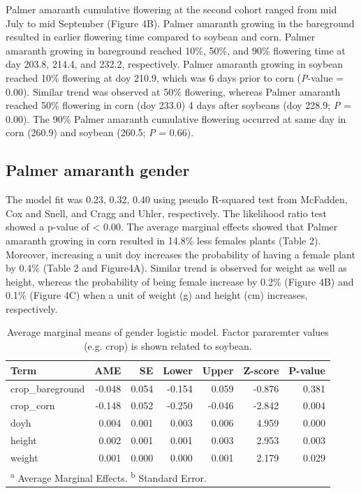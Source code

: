 \documentclass[utf8]{frontiersSCNS}
\begin{document}
Palmer amaranth cumulative flowering at the second cohort ranged from
mid July to mid September (Figure 4B). Palmer amaranth growing in the
bareground resulted in earlier flowering time compared to soybean and
corn. Palmer amaranth growing in bareground reached 10\%, 50\%, and 90\%
flowering time at day 203.8, 214.4, and 232.2, respectively. Palmer
amaranth growing in soybean reached 10\% flowering at doy 210.9, which
was 6 days prior to corn (\emph{P}-value = 0.00). Similar trend was
observed at 50\% flowering, whereas Palmer amaranth reached 50\%
flowering in corn (doy 233.0) 4 days after soybeans (doy 228.9; \emph{P}
= 0.00). The 90\% Palmer amaranth cumulative flowering occurred at same
day in corn (260.9) and soybean (260.5; \emph{P} = 0.66).

\hypertarget{palmer-amaranth-gender}{%
\subsection*{Palmer amaranth gender}\label{palmer-amaranth-gender}}

The model fit was 0.23, 0.32, 0.40 using pseudo R-squared test from
McFadden, Cox and Snell, and Cragg and Uhler, respectively. The
likelihood ratio test showed a p-value of \textless{} 0.00. The average
marginal effects showed that Palmer amaranth growing in corn resulted in
14.8\% less females plants (Table 2). Moreover, increasing a unit doy
increases the probability of having a female plant by 0.4\% (Table 2 and
Figure4A). Similar trend is observed for weight as well as height,
whereas the probability of being female increase by 0.2\% (Figure 4B)
and 0.1\% (Figure 4C) when a unit of weight (g) and height (cm)
increases, respectively.

\begin{table}[!h]

\caption{\label{tab:unnamed-chunk-3}Average marginal means of gender logistic model. Factor pararemter values (e.g. crop) is shown related to soybean.}
\centering
\fontsize{10}{12}\selectfont
\begin{tabular}[t]{lrrrrrr}
\toprule
Term & AME & SE & Lower & Upper & Z-score & P-value\\
\midrule
crop\_bareground & -0.048 & 0.054 & -0.154 & 0.059 & -0.876 & 0.381\\

crop\_corn & -0.148 & 0.052 & -0.250 & -0.046 & -2.842 & 0.004\\

doyh & 0.004 & 0.001 & 0.003 & 0.006 & 4.959 & 0.000\\

height & 0.002 & 0.001 & 0.001 & 0.003 & 2.953 & 0.003\\

weight & 0.001 & 0.000 & 0.000 & 0.001 & 2.179 & 0.029\\
\bottomrule
\multicolumn{7}{l}{\rule{0pt}{1em}\textsuperscript{a} Average Marginal Effects. \textsuperscript{b} Standard Error.}\\
\end{tabular}
\end{table}
\end{document}
